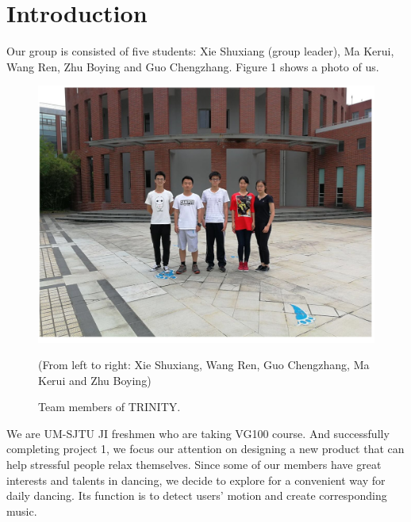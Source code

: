 \section{Introduction}
\par Our group is consisted of five students: Xie Shuxiang (group leader), Ma Kerui, Wang Ren, Zhu Boying and Guo Chengzhang. Figure 1 shows a photo of us.
\begin{figure}
    \centering
    \includegraphics[width=5in]{group}
    \caption{Team members of TRINITY.}
    (From left to right: Xie Shuxiang, Wang Ren, Guo Chengzhang, Ma Kerui and Zhu Boying)
\end{figure}

\par We are UM-SJTU JI freshmen who are taking VG100 course. And successfully completing project 1, we focus our attention on designing a new product that can help stressful people relax themselves. Since some of our members have great interests and talents in dancing, we decide to explore for a convenient way for daily dancing. Its function is to detect users' motion and create corresponding music.